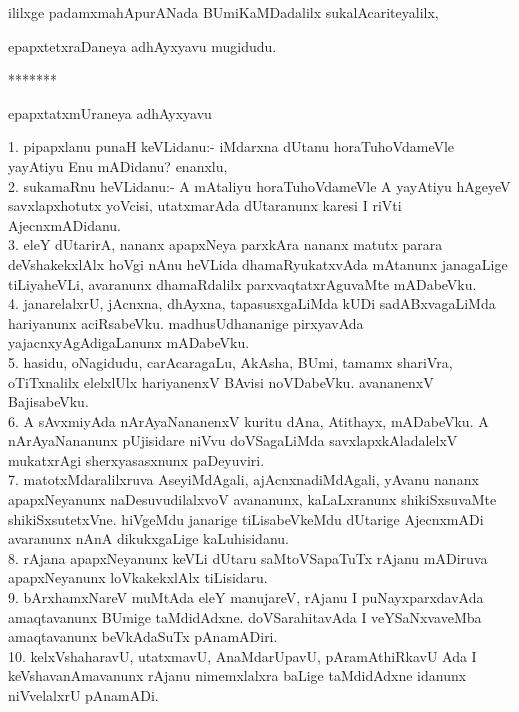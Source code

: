 \documentclass{article}
\begin{document}
\begin{center}
ililxge padamxmahApurANada BUmiKaMDadalilx sukalAcariteyalilx,
\end{center}

\begin{center}
epapxtetxraDaneya adhAyxyavu mugidudu.
\end{center}

\begin{center}
*******
\end{center}

\begin{center}
epapxtatxmUraneya adhAyxyavu
\end{center}

1. pipapxlanu punaH keVLidanu:- iMdarxna dUtanu horaTuhoVdameVle yayAtiyu Enu mADidanu? enanxlu,\\
2. sukamaRnu heVLidanu:- A mAtaliyu horaTuhoVdameVle A yayAtiyu hAgeyeV savxlapxhotutx yoVcisi, utatxmarAda dUtaranunx karesi I riVti AjecnxmADidanu.\\
3. eleY dUtarirA, nananx apapxNeya parxkAra nananx matutx parara deVshakekxlAlx hoVgi nAnu heVLida dhamaRyukatxvAda mAtanunx janagaLige tiLiyaheVLi, avaranunx dhamaRdalilx parxvaqtatxrAguvaMte mADabeVku.\\
4. janarelalxrU, jAcnxna, dhAyxna, tapasusxgaLiMda kUDi sadABxvagaLiMda hariyanunx aciRsabeVku. madhusUdhananige pirxyavAda yajacnxyAgAdigaLanunx mADabeVku.\\
5. hasidu, oNagidudu, carAcaragaLu, AkAsha, BUmi, tamamx shariVra, oTiTxnalilx elelxlUlx hariyanenxV BAvisi noVDabeVku. avananenxV BajisabeVku.\\
6. A sAvxmiyAda nArAyaNananenxV kuritu dAna, Atithayx, mADabeVku. A nArAyaNananunx pUjisidare niVvu doVSagaLiMda savxlapxkAladalelxV mukatxrAgi sherxyasasxnunx paDeyuviri.\\
7. matotxMdaralilxruva AseyiMdAgali, ajAcnxnadiMdAgali, yAvanu nananx apapxNeyanunx naDesuvudilalxvoV avananunx, kaLaLxranunx shikiSxsuvaMte shikiSxsutetxVne. hiVgeMdu janarige tiLisabeVkeMdu dUtarige AjecnxmADi avaranunx nAnA dikukxgaLige kaLuhisidanu.\\
8. rAjana apapxNeyanunx keVLi dUtaru saMtoVSapaTuTx rAjanu mADiruva apapxNeyanunx loVkakekxlAlx tiLisidaru.\\
9. bArxhamxNareV muMtAda eleY manujareV, rAjanu I puNayxparxdavAda amaqtavanunx BUmige taMdidAdxne. doVSarahitavAda I veYSaNxvaveMba amaqtavanunx beVkAdaSuTx pAnamADiri.\\
10. kelxVshaharavU, utatxmavU, AnaMdarUpavU, pAramAthiRkavU Ada I keVshavanAmavanunx rAjanu nimemxlalxra baLige taMdidAdxne idanunx niVvelalxrU pAnamADi.\\
\end{document}
